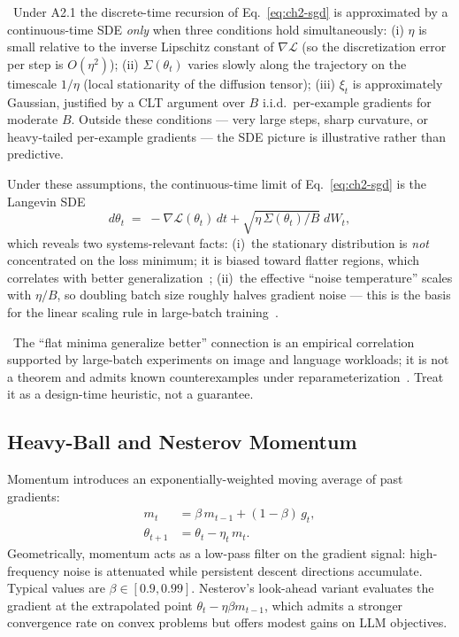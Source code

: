 \Assum\ Under A2.1 the discrete-time recursion of
Eq.~\eqref{eq:ch2-sgd} is approximated by a continuous-time SDE
\emph{only} when three conditions hold simultaneously: (i) $\eta$ is
small relative to the inverse Lipschitz constant of
$\nabla \mathcal{L}$ (so the discretization error per step is
$O(\eta^{2})$); (ii) $\Sigma(\theta_t)$ varies slowly along the
trajectory on the timescale $1/\eta$ (local stationarity of the
diffusion tensor); (iii) $\xi_t$ is approximately Gaussian, justified
by a CLT argument over $B$ i.i.d.\ per-example gradients for moderate
$B$. Outside these conditions — very large steps, sharp curvature,
or heavy-tailed per-example gradients — the SDE picture is
illustrative rather than predictive.

Under these assumptions, the continuous-time limit of
Eq.~\eqref{eq:ch2-sgd} is the Langevin SDE
\begin{equation}
\label{eq:ch2-langevin}
d\theta_t \;=\; -\nabla \mathcal{L}(\theta_t)\, dt
                + \sqrt{\eta\,\Sigma(\theta_t)/B}\; dW_t,
\end{equation}
which reveals two systems-relevant facts:
(i)~the stationary distribution is \emph{not} concentrated on the loss
minimum; it is biased toward flatter regions, which correlates with better
generalization~\citep{keskar2017large};
(ii)~the effective ``noise temperature'' scales with $\eta/B$, so doubling
batch size roughly halves gradient noise — this is the basis for the
linear scaling rule in large-batch training~\citep{goyal2017accurate}.

\Emp\ The ``flat minima generalize better'' connection is an
empirical correlation supported by large-batch experiments on image
and language workloads; it is not a theorem and admits known
counterexamples under reparameterization~\citep{dinh2017sharp}. Treat
it as a design-time heuristic, not a guarantee.

\subsection{Heavy-Ball and Nesterov Momentum}

Momentum introduces an exponentially-weighted moving average of past
gradients:
\begin{align}
m_t &= \beta\, m_{t-1} + (1-\beta)\, g_t, \label{eq:ch2-momentum-m} \\
\theta_{t+1} &= \theta_t - \eta_t\, m_t.
\end{align}
Geometrically, momentum acts as a low-pass filter on the gradient signal:
high-frequency noise is attenuated while persistent descent directions
accumulate. Typical values are $\beta \in [0.9, 0.99]$. Nesterov's
look-ahead variant evaluates the gradient at the extrapolated point
$\theta_t - \eta \beta m_{t-1}$, which admits a stronger convergence
rate on convex problems but offers modest gains on LLM objectives.

